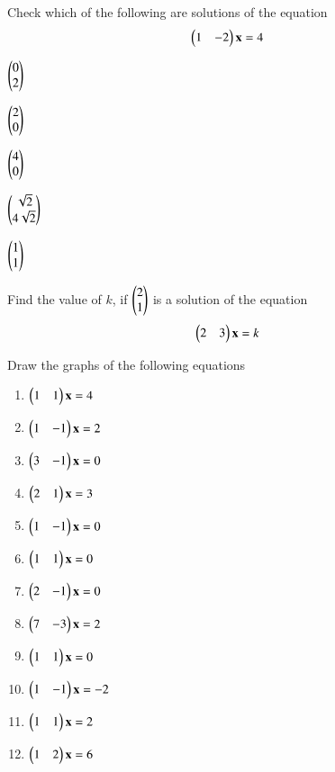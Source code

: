 %
%
\item Check which of the following are solutions of the equation 
%
\begin{align}
\begin{pmatrix}1 & -2\end{pmatrix}\mathbf{x} &= 4
\end{align}
%
%
\begin{enumerate}[itemsep=2pt]
\begin{multicols}{2}
\item $\begin{pmatrix}0 \\ 2\end{pmatrix}$
\item $\begin{pmatrix}2 \\ 0\end{pmatrix}$
\item $\begin{pmatrix}4 \\ 0\end{pmatrix}$
\item $\begin{pmatrix}\sqrt{2} \\ 4\sqrt{2}\end{pmatrix}$
\item $\begin{pmatrix}1 \\ 1\end{pmatrix}$
\end{multicols}
\end{enumerate}
%
\item Find the value of $k$, if $\begin{pmatrix}2\\1\end{pmatrix}$ is a solution of the equation 
%
%
\begin{align}
\begin{pmatrix}2 & 3\end{pmatrix}\mathbf{x} &= k
\end{align}
%
%
\item Draw the graphs of the following equations
\begin{enumerate}[itemsep=2pt]
\item $\begin{pmatrix}1 & 1\end{pmatrix}\mathbf{x} = 4$
\item $\begin{pmatrix} 1 & -1\end{pmatrix}\mathbf{x}  = 2 $
\item $\begin{pmatrix} 3 & -1\end{pmatrix}\mathbf{x}  = 0$
\item $\begin{pmatrix} 2 & 1\end{pmatrix}\mathbf{x}  = 3$
\item $\begin{pmatrix} 1 & -1\end{pmatrix}\mathbf{x}  = 0$
\item $\begin{pmatrix} 1& 1\end{pmatrix}\mathbf{x}  = 0$
\item $\begin{pmatrix} 2& -1\end{pmatrix}\mathbf{x}  = 0$
\item $\begin{pmatrix} 7& -3\end{pmatrix}\mathbf{x}  = 2$
\item $\begin{pmatrix} 1& 1\end{pmatrix}\mathbf{x}  = 0$
\item $\begin{pmatrix} 1& -1\end{pmatrix}\mathbf{x}  = -2$
\item $\begin{pmatrix} 1& 1\end{pmatrix}\mathbf{x}  = 2$
\item $\begin{pmatrix} 1& 2\end{pmatrix}\mathbf{x}  = 6$
\end{enumerate}
